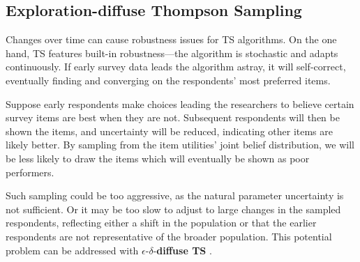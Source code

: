 \documentclass[nonblindrev]{informs3}
\newcommand{\edts}{$\epsilon$-$\delta$-\textbf{diffuse TS} }
\begin{document}
\subsection{Exploration-diffuse Thompson Sampling}

Changes over time can cause robustness issues for TS algorithms. On the one hand, TS features built-in robustness---the algorithm is stochastic and adapts continuously. If early survey data leads the algorithm astray, it will self-correct, eventually finding and converging on the respondents' most preferred items. 

Suppose  early respondents make choices leading the researchers to believe certain survey items are best when they are not. Subsequent respondents will then be shown the items, and uncertainty will be reduced, indicating other items are likely better. By sampling from the item utilities' joint belief distribution, we will be less likely to draw the items which will eventually be shown as poor performers. 

Such sampling could be too aggressive, as the natural parameter uncertainty is not sufficient. Or it may be too slow to adjust to large changes in the sampled respondents, reflecting either a shift in the population or that the earlier respondents are not representative of the broader population. This potential problem can be addressed with \edts.
\end{document}
